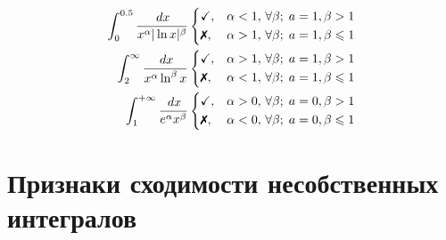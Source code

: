 \begin{minipage}[]{0.35\textwidth}
\begin{equation*}
\begin{split}
        \int_0^{0.5} \frac{\d x}{x^{\alpha} |\ln x|^{\beta}}
        &\left\{\begin{aligned}
            &{
                \checkmark
            }  ,&{
                \alpha < 1, \, \forall \beta;\; a=1, \beta > 1
            }\\
            &{
                \text{\xmark}
            }  ,&{
                \alpha > 1, \, \forall \beta;\; a=1, \beta \leq 1
            }
        \end{aligned} \right. \\
        \int_2^{\infty} \frac{\d x}{x^{{\alpha}} \ln^{\beta} x}
        &\left\{\begin{aligned}
            &{
                \checkmark
            }  ,&{
                \alpha > 1, \, \forall \beta;\; a=1, \beta > 1
            }\\
            &{
                \text{\xmark}
            }  ,&{
                \alpha < 1, \, \forall \beta;\; a=1, \beta \leq 1
            }
        \end{aligned} \right.  \\
        \int_1^{+\infty} \frac{\d x}{e^{\alpha} x^{\beta}}
        &\left\{\begin{aligned}
            &{
                \checkmark
            }  ,&{
                \alpha > 0, \, \forall \beta;\; a=0, \beta > 1
            }\\
            &{
                \text{\xmark}
            }  ,&{
                \alpha < 0, \, \forall \beta;\; a=0, \beta \leq 1
            }
        \end{aligned} \right. 
\end{split}
\end{equation*}
\end{minipage}


\section*{Признаки сходимости несобственных интегралов}

